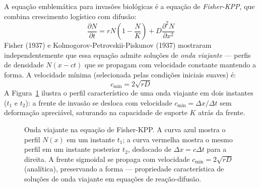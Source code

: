 A equação emblemática para invasões biológicas é a equação de
\emph{Fisher-KPP}, que combina crescimento logístico com difusão:
\begin{equation}
\frac{\partial N}{\partial t} = r N \left(1 - \frac{N}{K}\right)
                              + D \frac{\partial^2 N}{\partial x^2}
\end{equation}
Fisher (1937) e Kolmogorov-Petrovskii-Piskunov (1937) mostraram
independentemente que essa equação admite soluções de \emph{onda viajante} ---
perfis de densidade $N(x - ct)$ que se propagam com velocidade constante
mantendo a forma. A velocidade mínima (selecionada pelas condições iniciais
suaves) é:
\begin{equation}
c_{\min} = 2\sqrt{r D}
\end{equation}
A Figura~\ref{fig:10-fkpp} ilustra o perfil característico de uma onda
viajante em dois instantes ($t_1$ e $t_2$): a frente de invasão se desloca
com velocidade $c_{\min} = \Delta x / \Delta t$ sem deformação apreciável,
saturando na capacidade de suporte $K$ atrás da frente.

\begin{figure}[htbp]
\centering
{}
\caption{Onda viajante na equação de Fisher-KPP. A curva azul mostra o perfil $N(x)$ em um instante $t_1$; a curva vermelha mostra o mesmo perfil em um instante posterior $t_2$, deslocado de $\Delta x = c\Delta t$ para a direita. A frente sigmoidal se propaga com velocidade $c_{\min} = 2\sqrt{rD}$ (analítica), preservando a forma --- propriedade característica de soluções de onda viajante em equações de reação-difusão.}
\label{fig:10-fkpp}
\end{figure}

